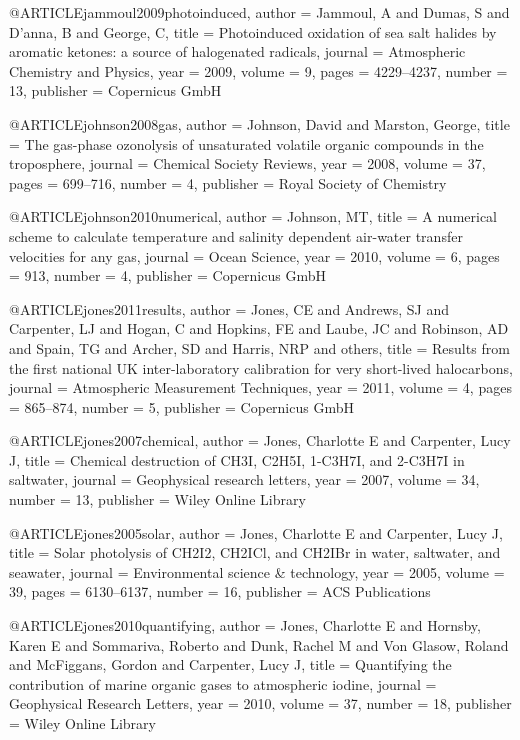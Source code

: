 @ARTICLE{jammoul2009photoinduced,
  author = {Jammoul, A and Dumas, S and D'anna, B and George, C},
  title = {Photoinduced oxidation of sea salt halides by aromatic ketones: a
	source of halogenated radicals},
  journal = {Atmospheric Chemistry and Physics},
  year = {2009},
  volume = {9},
  pages = {4229--4237},
  number = {13},
  publisher = {Copernicus GmbH}
}

@ARTICLE{johnson2008gas,
  author = {Johnson, David and Marston, George},
  title = {The gas-phase ozonolysis of unsaturated volatile organic compounds
	in the troposphere},
  journal = {Chemical Society Reviews},
  year = {2008},
  volume = {37},
  pages = {699--716},
  number = {4},
  publisher = {Royal Society of Chemistry}
}

@ARTICLE{johnson2010numerical,
  author = {Johnson, MT},
  title = {A numerical scheme to calculate temperature and salinity dependent
	air-water transfer velocities for any gas},
  journal = {Ocean Science},
  year = {2010},
  volume = {6},
  pages = {913},
  number = {4},
  publisher = {Copernicus GmbH}
}

@ARTICLE{jones2011results,
  author = {Jones, CE and Andrews, SJ and Carpenter, LJ and Hogan, C and Hopkins,
	FE and Laube, JC and Robinson, AD and Spain, TG and Archer, SD and
	Harris, NRP and others},
  title = {Results from the first national UK inter-laboratory calibration for
	very short-lived halocarbons},
  journal = {Atmospheric Measurement Techniques},
  year = {2011},
  volume = {4},
  pages = {865--874},
  number = {5},
  publisher = {Copernicus GmbH}
}

@ARTICLE{jones2007chemical,
  author = {Jones, Charlotte E and Carpenter, Lucy J},
  title = {Chemical destruction of CH3I, C2H5I, 1-C3H7I, and 2-C3H7I in saltwater},
  journal = {Geophysical research letters},
  year = {2007},
  volume = {34},
  number = {13},
  publisher = {Wiley Online Library}
}

@ARTICLE{jones2005solar,
  author = {Jones, Charlotte E and Carpenter, Lucy J},
  title = {Solar photolysis of CH2I2, CH2ICl, and CH2IBr in water, saltwater,
	and seawater},
  journal = {Environmental science \& technology},
  year = {2005},
  volume = {39},
  pages = {6130--6137},
  number = {16},
  publisher = {ACS Publications}
}

@ARTICLE{jones2010quantifying,
  author = {Jones, Charlotte E and Hornsby, Karen E and Sommariva, Roberto and
	Dunk, Rachel M and Von Glasow, Roland and McFiggans, Gordon and Carpenter,
	Lucy J},
  title = {Quantifying the contribution of marine organic gases to atmospheric
	iodine},
  journal = {Geophysical Research Letters},
  year = {2010},
  volume = {37},
  number = {18},
  publisher = {Wiley Online Library}
}


